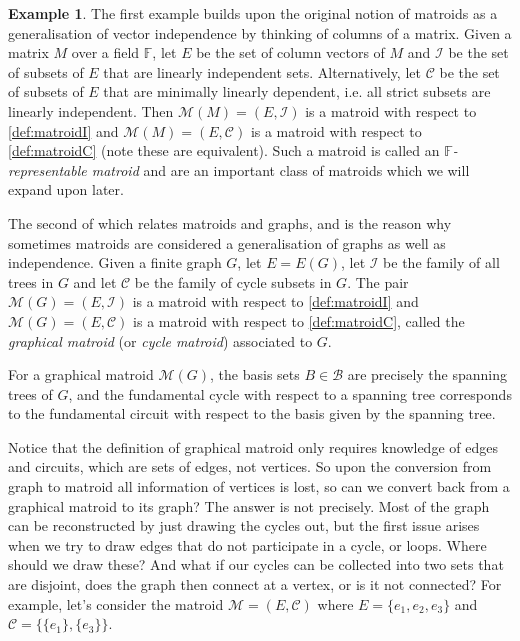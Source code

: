 \documentclass[12pt]{report}
\theoremstyle{definition}
\newtheorem{example}[theorem]{Example}
\def\F{\mathbb F}
\def\calB{\mathcal B}
\def\calC{\mathcal C}
\def\calI{\mathcal I}
\def\calM{\mathcal M}
\theoremstyle{upright}
\begin{document}
\begin{example}

    The first example builds upon the original notion of matroids as a generalisation of vector independence by thinking of columns of a matrix.
    Given a matrix $M$ over a field $\F$, let $E$ be the set of column vectors of $M$ and $\calI$ be the set of subsets of $E$ that are linearly independent sets.
    Alternatively, let $\calC$ be the set of subsets of $E$ that are minimally linearly dependent, i.e. all strict subsets are linearly independent.
    Then $\calM(M)=(E,\calI)$ is a matroid with respect to \cref{def:matroidI} and $\calM(M)=(E,\calC)$ is a matroid with respect to \cref{def:matroidC} (note these are equivalent).
    Such a matroid is called an \textit{$\F$-representable matroid} and are an important class of matroids which we will expand upon later.
    
    The second of which relates matroids and graphs, and is the reason why sometimes matroids are considered a generalisation of graphs as well as independence.
    Given a finite graph $G$, let $E=E(G)$, let $\calI$ be the family of all trees in $G$ and let $\calC$ be the family of cycle subsets in $G$.
    The pair $\calM(G)=(E, \calI)$ is a matroid with respect to \cref{def:matroidI} and $\calM(G)=(E, \calC)$ is a matroid with respect to \cref{def:matroidC}, called the {\em graphical matroid} (or {\em cycle matroid}) associated to $G$.
    
\end{example}

For a graphical matroid $\calM(G)$, the basis sets $B\in\calB$ are precisely the spanning trees of $G$, and the fundamental cycle with respect to a spanning tree corresponds to the fundamental circuit with respect to the basis given by the spanning tree.

Notice that the definition of graphical matroid only requires knowledge of edges and circuits, which are sets of edges, not vertices.
So upon the conversion from graph to matroid all information of vertices is lost, so can we convert back from a graphical matroid to its graph?
The answer is not precisely.
Most of the graph can be reconstructed by just drawing the cycles out, but the first issue arises when we try to draw edges that do not participate in a cycle, or loops.
Where should we draw these?
And what if our cycles can be collected into two sets that are disjoint, does the graph then connect at a vertex, or is it not connected?
For example, let's consider the matroid $\calM=(E, \calC)$ where $E=\{e_1, e_2, e_3\}$ and $\calC=\{\{e_1\}, \{e_3\}\}$.
\end{document}
